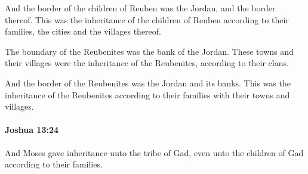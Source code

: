 			\begin{versebox}
					\item[BHS] 
					\item[ASV] And the border of the children of Reuben was the Jordan, and the border thereof. This was the inheritance of the children of Reuben according to their families, the cities and the villages thereof.
					\item[NIV] The boundary of the Reubenites was the bank of the Jordan. These towns and their villages were the inheritance of the Reubenites, according to their clans.
					\item[NRSV] And the border of the Reubenites was the Jordan and its banks. This was the inheritance of the Reubenites according to their families with their towns and villages.
			\end{versebox}

		\paragraph{Joshua 13:24} %
			\label{JOSHUA-13-24}

			And Moses gave inheritance unto the tribe of Gad, even unto the children of Gad according to their families.

